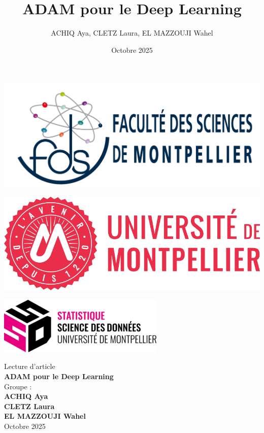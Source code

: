 \documentclass[a4paper,12pt]{article}
\title{ADAM pour le Deep Learning}
\author{ACHIQ Aya, CLETZ Laura, EL MAZZOUJI Wahel}
\date{Octobre 2025}
\begin{document}
\begin{titlepage}
\centering

\begin{minipage}{0.3\textwidth}
    \includegraphics[width=\linewidth]{images/FdS.jpg}
\end{minipage}
\hfill
\begin{minipage}{0.3\textwidth}
    \includegraphics[width=\linewidth]{images/UM.png}
\end{minipage}
\hfill
\begin{minipage}{0.3\textwidth}
    \includegraphics[width=\linewidth]{images/SSD.png}
\end{minipage}

\vspace{3cm}

{\Large Lecture d'article}\\[0.4cm]
{\LARGE \textbf{ADAM pour le Deep Learning}}\\[1.2cm]

{\large Groupe :}\\[0.3cm]
\textbf{ACHIQ Aya}\\
\textbf{CLETZ Laura}\\
\textbf{EL MAZZOUJI Wahel}\\[1.5cm]

{\large Octobre 2025}

\vfill
\end{titlepage}
\end{document}
